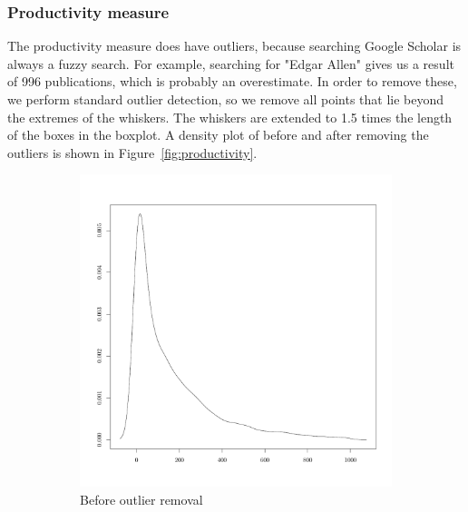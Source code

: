 \subsubsection{Productivity measure}
\label{sssec:productivity}
The productivity measure does have outliers, because searching Google Scholar is always a fuzzy search. For example, searching for "Edgar Allen" gives us a result of 996 publications, which is  probably an overestimate. In order to remove these, we perform standard outlier detection, so we remove all points that lie beyond the extremes of the whiskers. The whiskers are extended to 1.5 times the length of the boxes in the boxplot. A density plot of before and after removing the outliers is shown in Figure~\ref{fig:productivity}.

\begin{figure}
    \centering
    \begin{subfigure}[b]{0.3\textwidth}
        \includegraphics[width=\textwidth]{figures/prodInitialDensity.pdf}
        \caption{Before outlier removal}
        \label{fig:prodInitialDensity}
    \end{subfigure}
    \quad
    \begin{subfigure}[b]{0.3\textwidth}

\end{subfigure}
\end{figure}
